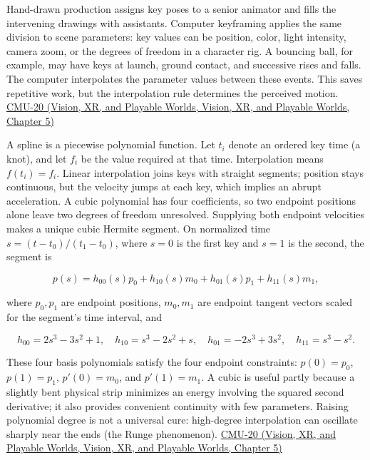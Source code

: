 Hand-drawn production assigns key poses to a senior animator and fills the intervening drawings with assistants. Computer keyframing applies the same division to scene parameters: key values can be position, color, light intensity, camera zoom, or the degrees of freedom in a character rig. A bouncing ball, for example, may have keys at launch, ground contact, and successive rises and falls. The computer interpolates the parameter values between these events. This saves repetitive work, but the interpolation rule determines the perceived motion. \href{../07-Vision-XR-and-Playable-Worlds/main.pdf\#nameddest=04-visual-computing-ii-ch036-cmu-20---introduction-to-animation}{CMU-20 (Vision, XR, and Playable Worlds, Vision, XR, and Playable Worlds, Chapter 5)}

A spline is a piecewise polynomial function. Let \(t_i\) denote an ordered key time (a knot), and let \(f_i\) be the value required at that time. Interpolation means \(f(t_i)=f_i\). Linear interpolation joins keys with straight segments; position stays continuous, but the velocity jumps at each key, which implies an abrupt acceleration. A cubic polynomial has four coefficients, so two endpoint positions alone leave two degrees of freedom unresolved. Supplying both endpoint velocities makes a unique cubic Hermite segment. On normalized time \(s=(t-t_0)/(t_1-t_0)\), where \(s=0\) is the first key and \(s=1\) is the second, the segment is

\[
p(s)=h_{00}(s)p_0+h_{10}(s)m_0+h_{01}(s)p_1+h_{11}(s)m_1,
\]

where \(p_0,p_1\) are endpoint positions, \(m_0,m_1\) are endpoint tangent vectors scaled for the segment's time interval, and

\[
h_{00}=2s^3-3s^2+1,\quad h_{10}=s^3-2s^2+s,\quad h_{01}=-2s^3+3s^2,\quad h_{11}=s^3-s^2.
\]

These four basis polynomials satisfy the four endpoint constraints: \(p(0)=p_0\), \(p(1)=p_1\), \(p'(0)=m_0\), and \(p'(1)=m_1\). A cubic is useful partly because a slightly bent physical strip minimizes an energy involving the squared second derivative; it also provides convenient continuity with few parameters. Raising polynomial degree is not a universal cure: high-degree interpolation can oscillate sharply near the ends (the Runge phenomenon). \href{../07-Vision-XR-and-Playable-Worlds/main.pdf\#nameddest=04-visual-computing-ii-ch036-cmu-20---introduction-to-animation}{CMU-20 (Vision, XR, and Playable Worlds, Vision, XR, and Playable Worlds, Chapter 5)}

